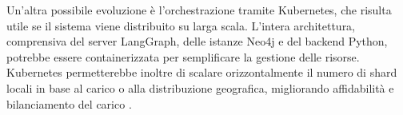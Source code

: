 Un'altra possibile evoluzione è l'orchestrazione tramite Kubernetes, che risulta utile se il sistema viene distribuito su larga scala. L'intera architettura, comprensiva del server LangGraph, delle istanze Neo4j e del backend Python, potrebbe essere containerizzata per semplificare la gestione delle risorse. Kubernetes permetterebbe inoltre di scalare orizzontalmente il numero di shard locali in base al carico o alla distribuzione geografica, migliorando affidabilità e bilanciamento del carico \cite{kubernetes}.